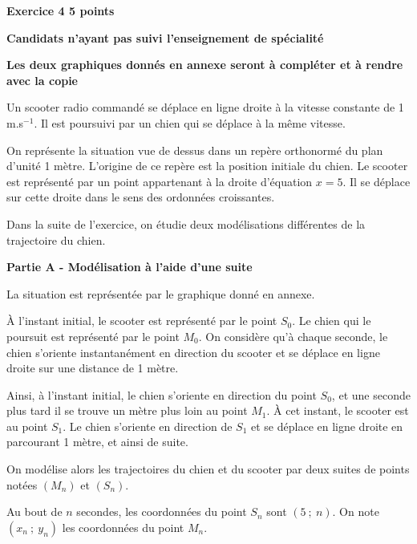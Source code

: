 \documentclass[10pt,a4paper]{article}
\begin{document}
\vspace{0,5cm}

\textbf{Exercice 4 \hfill  5 points}

\textbf{Candidats n'ayant pas suivi l'enseignement de spécialité}

\medskip

\textbf{Les deux graphiques donnés en annexe seront à compléter et à rendre avec la copie}

\medskip

Un scooter radio commandé se déplace en ligne droite à la vitesse constante de 1 m.s$^{-1}$. Il est poursuivi
par un chien qui se déplace à la même vitesse. 

On représente la situation vue de dessus dans un repère orthonormé du plan d'unité 1 mètre. L'origine de ce repère est la position initiale du chien. Le scooter est représenté par un point appartenant à la droite d'équation $x = 5$. Il se déplace sur cette droite dans le sens des ordonnées croissantes.

\smallskip

Dans la suite de l'exercice, on étudie deux modélisations différentes de la trajectoire du chien.

\bigskip

\textbf{Partie A - Modélisation à l'aide d'une suite}

\medskip

La situation est représentée par le graphique  donné en annexe.

À l'instant initial, le scooter est représenté par le point $S_0$. Le chien qui le poursuit est représenté
par le point $M_0$. On considère qu'à chaque seconde, le chien s'oriente instantanément en direction
du scooter et se déplace en ligne droite sur une distance de 1 mètre.

Ainsi, à l'instant initial, le chien s'oriente en direction du point $S_0$, et une seconde plus tard il se
trouve un mètre plus loin au point $M_1$. À cet instant, le scooter est au point $S_1$. Le chien s'oriente
en direction de $S_1$ et se déplace en ligne droite en parcourant 1 mètre, et ainsi de suite.

On modélise alors les trajectoires du chien et du scooter par deux suites de points notées $\left(M_n\right)$ et $\left(S_n\right)$.

Au bout de $n$ secondes, les coordonnées du point $S_n$ sont $(5~;~n)$. On note $\left(x_n~;~y_n\right)$ les coordonnées du point $M_n$.

\medskip
\end{document}
